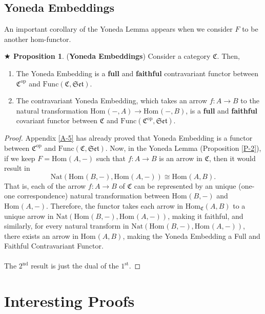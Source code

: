 \documentclass{article}
\theoremstyle{definition}
\theoremstyle{remark}
\theoremstyle{definition}
\theoremstyle{definition}
\newtheorem{proposition}{$\bigstar$ Proposition}
\theoremstyle{definition}
\newcommand{\isomorph}{\cong}
\newcommand{\cat}[1]{\mathfrak{#1}}
\newcommand{\opcat}[1]{\mathfrak{#1}^{\text{op}}}
\newcommand{\homset}[3]{\text{Hom}_{#1}(#2,#3)}
\newcommand{\Func}[2]{\text{Func}\left (#1,#2\right )}
\newcommand{\Nat}[2]{\text{Nat}\left (#1,#2\right )}
\begin{document}
\subsection{Yoneda Embeddings}
An important corollary of the Yoneda Lemma appears when we consider $ F $ to be another hom-functor. 
\begin{proposition}\label{P-3}
	(\textbf{Yoneda Embeddings}) Consider a category $ \cat{C} $. Then,
	\begin{enumerate}
		\item {The Yoneda Embedding is a \textbf{full} and \textbf{faithful} contravariant functor between $ \opcat{C} $ and $ \Func{\cat{C}}{\cat{Set}} $.}
		\item {The contravariant Yoneda Embedding, which takes an arrow $ f : A\to B$ to the natural transformation $ \homset{}{-}{A} \longrightarrow \homset{}{-}{B}$, is a \textbf{full} and \textbf{faithful} covariant functor between $ \cat{C} $ and $ \Func{\opcat{C}}{\cat{Set}} $.} 
	\end{enumerate}
\end{proposition}
\begin{proof}
	Appendix \ref{A-5} has already proved that Yoneda Embedding is a functor between $ \opcat{C} $ and $ \Func{\cat{C}}{\cat{Set}} $. Now, in the Yoneda Lemma (Proposition \ref{P-2}), if we keep $ F = \homset{}{A}{-} $ such that $ f : A\to B $ is an arrow in $ \cat{C} $, then it would result in 
	\[\Nat{\homset{}{B}{-}}{\homset{}{A}{-}} \isomorph \homset{}{A}{B}.\]
	That is, each of the arrow $ f : A\to B $ of $ \cat{C} $ can be represented by an unique (one-one correspondence) natural transformation between $ \homset{}{B}{-} $ and $ \homset{}{A}{-} $. Therefore, the functor takes each arrow in $ \homset{\cat{C}}{A}{B} $ to a unique arrow in $ \Nat{\homset{}{B}{-}}{\homset{}{A}{-}} $, making it faithful, and similarly, for every natural transform in $ \Nat{\homset{}{B}{-}}{\homset{}{A}{-}} $, there exists an arrow in $ \homset{}{A}{B} $, making the Yoneda Embedding a Full and Faithful Contravariant Functor.\\\\
	The $ 2^{\text{nd}} $ result is just the dual of the $ 1^{\text{st}} $.
\end{proof}

\newpage
\appendix
\section{Interesting Proofs}
\end{document}
